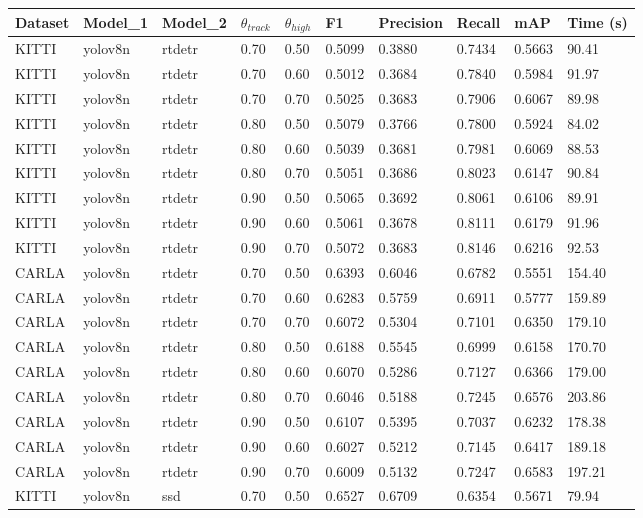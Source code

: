 \begin{tabular}{llllllllll}
\toprule
Dataset & Model_1 & Model_2 & $\theta_{track}$ & $\theta_{high}$ & F1 & Precision & Recall & mAP & Time (s) \\
\midrule
KITTI & yolov8n & rtdetr & 0.70 & 0.50 & 0.5099 & 0.3880 & 0.7434 & 0.5663 & 90.41 \\
KITTI & yolov8n & rtdetr & 0.70 & 0.60 & 0.5012 & 0.3684 & 0.7840 & 0.5984 & 91.97 \\
KITTI & yolov8n & rtdetr & 0.70 & 0.70 & 0.5025 & 0.3683 & 0.7906 & 0.6067 & 89.98 \\
KITTI & yolov8n & rtdetr & 0.80 & 0.50 & 0.5079 & 0.3766 & 0.7800 & 0.5924 & 84.02 \\
KITTI & yolov8n & rtdetr & 0.80 & 0.60 & 0.5039 & 0.3681 & 0.7981 & 0.6069 & 88.53 \\
KITTI & yolov8n & rtdetr & 0.80 & 0.70 & 0.5051 & 0.3686 & 0.8023 & 0.6147 & 90.84 \\
KITTI & yolov8n & rtdetr & 0.90 & 0.50 & 0.5065 & 0.3692 & 0.8061 & 0.6106 & 89.91 \\
KITTI & yolov8n & rtdetr & 0.90 & 0.60 & 0.5061 & 0.3678 & 0.8111 & 0.6179 & 91.96 \\
KITTI & yolov8n & rtdetr & 0.90 & 0.70 & 0.5072 & 0.3683 & 0.8146 & 0.6216 & 92.53 \\
CARLA & yolov8n & rtdetr & 0.70 & 0.50 & 0.6393 & 0.6046 & 0.6782 & 0.5551 & 154.40 \\
CARLA & yolov8n & rtdetr & 0.70 & 0.60 & 0.6283 & 0.5759 & 0.6911 & 0.5777 & 159.89 \\
CARLA & yolov8n & rtdetr & 0.70 & 0.70 & 0.6072 & 0.5304 & 0.7101 & 0.6350 & 179.10 \\
CARLA & yolov8n & rtdetr & 0.80 & 0.50 & 0.6188 & 0.5545 & 0.6999 & 0.6158 & 170.70 \\
CARLA & yolov8n & rtdetr & 0.80 & 0.60 & 0.6070 & 0.5286 & 0.7127 & 0.6366 & 179.00 \\
CARLA & yolov8n & rtdetr & 0.80 & 0.70 & 0.6046 & 0.5188 & 0.7245 & 0.6576 & 203.86 \\
CARLA & yolov8n & rtdetr & 0.90 & 0.50 & 0.6107 & 0.5395 & 0.7037 & 0.6232 & 178.38 \\
CARLA & yolov8n & rtdetr & 0.90 & 0.60 & 0.6027 & 0.5212 & 0.7145 & 0.6417 & 189.18 \\
CARLA & yolov8n & rtdetr & 0.90 & 0.70 & 0.6009 & 0.5132 & 0.7247 & 0.6583 & 197.21 \\
KITTI & yolov8n & ssd & 0.70 & 0.50 & 0.6527 & 0.6709 & 0.6354 & 0.5671 & 79.94 \\

\end{tabular}
